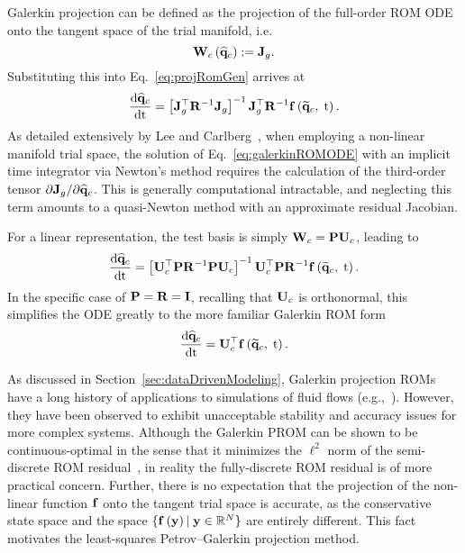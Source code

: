 Galerkin projection can be defined as the projection of the full-order ROM ODE onto the tangent space of the trial manifold, i.e.
%
\begin{equation}
    \testBasisCons\left(\consVecCoef\right) \defEq \jacobDecode.
\end{equation}
%
Substituting this into Eq.~\ref{eq:projRomGen} arrives at
%
\begin{equation}\label{eq:galerkinROMODE}
    \ode{\consVecCoef}{\timeVar} = \left[\jacobDecode^\top \resScaleInv \jacobDecode\right]^{-1} \jacobDecode^\top \resScaleInv \rhsFunc{\consVecRom, \; \timeVar}.
\end{equation}
%
As detailed extensively by Lee and Carlberg~\cite{Lee2020}, when employing a non-linear manifold trial space, the solution of Eq.~\ref{eq:galerkinROMODE} with an implicit time integrator via Newton's method requires the calculation of the third-order tensor $\partial \mathbf{J}_{g} / \partial \mathbf{\widehat{q}}_{c}$. This is generally computational intractable, and neglecting this term amounts to a quasi-Newton method with an approximate residual Jacobian.

For a linear representation, the test basis is simply $\testBasisCons = \consScale \consTrial$, leading to
%
\begin{equation}\label{eq:galerkinROMODELinear}
	\ode{\consVecCoef}{\timeVar} = \left[\consTrial^\top \consScale \resScaleInv \consScale \consTrial\right]^{-1} \consTrial^\top \consScale \resScaleInv \rhsFunc{\consVecRom, \; \timeVar}.
\end{equation}
%
In the specific case of $\consScale = \resScale = \identMat$, recalling that $\consTrial$ is orthonormal, this simplifies the ODE greatly to the more familiar Galerkin ROM form
%
\begin{equation}\label{eq:galerkinROMODELinearSimple}
    \ode{\consVecCoef}{\timeVar} = \consTrial^\top \rhsFunc{\consVecRom, \; \timeVar}.
\end{equation}

As discussed in Section~\ref{sec:dataDrivenModeling}, Galerkin projection ROMs have a long history of applications to simulations of fluid flows (e.g.,~\cite{Aubry1988,Cazemier1998,BuiThanh2007}). However, they have been observed to exhibit unacceptable stability and accuracy issues for more complex systems. Although the Galerkin PROM can be shown to be continuous-optimal in the sense that it minimizes the $\ell^2$ norm of the semi-discrete ROM residual~\cite{Carlberg2017}, in reality the fully-discrete ROM residual is of more practical concern. Further, there is no expectation that the projection of the non-linear function $\mathbf{f}$ onto the tangent trial space is accurate, as the conservative state space and the space $\{\mathbf{f} \left(\mathbf{y}\right) \vert \; \mathbf{y} \in \mathbb{R}^{N} \}$ are entirely different. This fact motivates the least-squares Petrov--Galerkin projection method.

